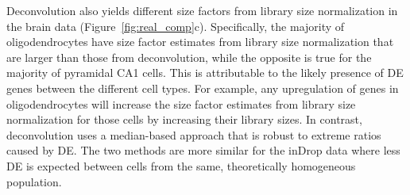\documentclass{bmcart}
\def\texttt{[image: ]}
\begin{document}

Deconvolution also yields different size factors from library size normalization in the brain data (Figure~\ref{fig:real_comp}c).
Specifically, the majority of oligodendrocytes have size factor estimates from library size normalization that are larger than those from deconvolution,
    while the opposite is true for the majority of pyramidal CA1 cells.
This is attributable to the likely presence of DE genes between the different cell types.
For example, any upregulation of genes in oligodendrocytes will increase the size factor estimates from library size normalization for those cells by increasing their library sizes.
In contrast, deconvolution uses a median-based approach that is robust to extreme ratios caused by DE.
The two methods are more similar for the inDrop data where less DE is expected between cells from the same, theoretically homogeneous population.

\end{document}
